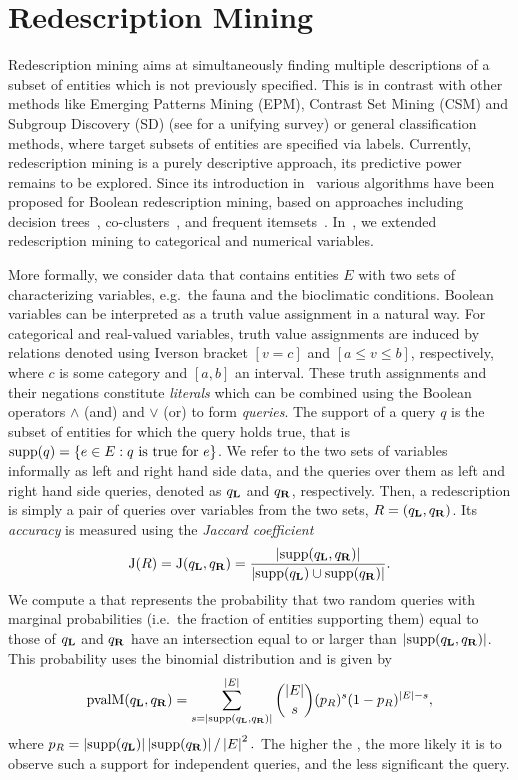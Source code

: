\section{Redescription Mining}
\label{sec:redescription-mining}

Redescription mining aims at simultaneously finding multiple
descriptions of a subset of entities which is not previously
specified.  This is in contrast with other methods like Emerging
Patterns Mining (EPM), Contrast Set Mining (CSM) and Subgroup
Discovery (SD) (see \cite{kralj09supervised} for a unifying survey) or
general classification methods, where target subsets of entities are
specified via labels.  Currently, redescription mining is a purely
descriptive approach, its predictive power remains to be explored.
Since its introduction in~\cite{ramakrishnan04turning} various
algorithms have been proposed for Boolean redescription mining, based
on approaches including decision
trees~\cite{ramakrishnan04turning,kumar07redescription},
co-clusters~\cite{parida05redescription}, and frequent
itemsets~\cite{gallo08finding}. In~\cite{galbrun11black}, we extended
redescription mining to categorical and numerical variables.

More formally, we consider data that contains entities $E$ with two sets
of characterizing variables, e.g.\ the fauna and the bioclimatic
conditions. 
Boolean variables can be interpreted as a truth value
assignment in a natural way.  For categorical and real-valued
variables, truth value assignments are induced by relations denoted using Iverson bracket $[v=c]$
and $[a \leq v \leq b]$, respectively, where $c$ is some category and
$[a, b]$ an interval.  These truth assignments and their negations
constitute \emph{literals} which can be combined using the Boolean
operators $\land$ (and) and $\lor$ (or) to form \emph{queries}.
The support of a query $q$ is the subset of entities for which
the query holds true, that is 
$\operatorname*{supp}(q) = \{e\in E : q\text{ is true for } e\}$.
We refer to the two sets of variables informally as left and right
hand side data, and the queries over them as left and
right hand side queries, denoted as  $q_{\mathbf{L}}$ and  $q_{\mathbf{R}}$, respectively.
Then, a redescription is simply a pair of queries over variables from the
two sets, $R=(q_{\mathbf{L}},q_{\mathbf{R}})$.    
Its \emph{accuracy} is 
measured using the \emph{Jaccard coefficient} 
\[
\jacc(R)= \jacc(q_\iLHS,q_\iRHS) = \frac{\abs{\supp(q_\iLHS,q_\iRHS)}}%
{\abs{\supp(q_\iLHS)\cup\supp(q_\iRHS)}}.
\]
We compute a \pValue{} that represents the probability that two random
queries with marginal probabilities (i.e.\ the fraction of entities
supporting them) equal to those of $q_{\mathbf{L}}$ and $q_{\mathbf{R}}$ have an
intersection equal to or larger than $\abs{\supp(q_\iLHS,
  q_\iRHS)}$. This probability uses the binomial distribution and is given by \[
\text{pvalM}(q_\iLHS, q_\iRHS) = \sum_{s=\abs{\supp(q_\iLHS, q_\iRHS)}}^{\abs{E}} {\abs{E} \choose s} (p_R)^s (1- p_R)^{\abs{E} - s},\]
where $p_R = \abs{\supp(q_\iLHS)}\abs{\supp(q_\iRHS)}/\abs{E}^2.$
The higher the \pValue, the more likely it is to observe such a
support for independent queries, and the less significant the query.


